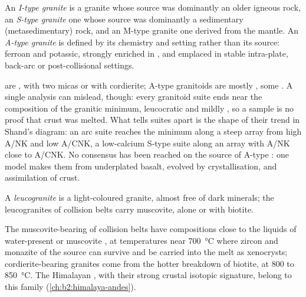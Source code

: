 \begin{definition}\label{def:b2:crustal-melting:types}
An \emph{I-type granite} is a granite whose source was dominantly an
older igneous rock, an \emph{S-type granite} one whose source was
dominantly a sedimentary (metasedimentary) rock, and an M-type granite one derived from
the mantle. An \emph{A-type granite} is defined by its chemistry and
setting rather than its source: ferroan and potassic, strongly enriched in , and emplaced in stable intra-plate, back-arc or post-collisional settings.
\end{definition}

 are , with two micas or with cordierite; A-type granitoids
are mostly , some . A single analysis can mislead, though: every
granitoid suite ends near the composition of the granitic minimum, leucocratic and mildly
, so a  sample is no proof that crust was melted. What tells
suites apart is the shape of their trend in Shand's diagram: an arc suite reaches the
minimum along a steep array from high A/NK and low A/CNK, a low-calcium S-type suite
along an array with A/NK close to A/CNK. No consensus has been reached on the source of
A-type : one model makes them from underplated basalt, evolved by crystallisation,
 and assimilation of crust.

\begin{definition}[Leucogranite]\label{def:b2:crustal-melting:leucogranite}
A \emph{leucogranite} is a light-coloured granite, almost free of
dark minerals; the  leucogranites of collision belts carry muscovite, alone or
with biotite.
\end{definition}

The muscovite-bearing   of collision belts have compositions close
to the liquids of water-present or muscovite , at temperatures near
\qty{700}{\celsius} where zircon and monazite of the source can survive and be carried
into the melt as xenocrysts; cordierite-bearing  granites come from the
hotter breakdown of biotite, at 800 to \qty{850}{\celsius}. The Himalayan ,
with their strong crustal isotopic signature, belong to this family
(\cref{ch:b2:himalaya-andes}).

